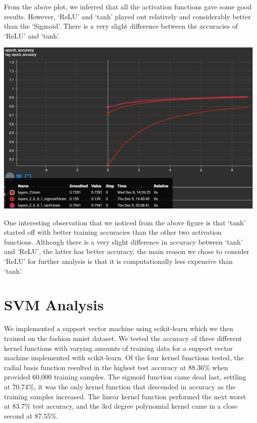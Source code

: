 \documentclass[12pt]{article}
\begin{document}
From the above plot, we inferred that all the activation functions gave some good results. However, ‘ReLU’ and ‘tanh’ played out relatively and considerably better than the ‘Sigmoid’. There is a very slight difference between the accuracies of ‘ReLU’ and ‘tanh’. 

\bigskip

\includegraphics[scale=.77]{cnngraph4.PNG}

\newpage

One interesting observation that we noticed from the above figure is that ‘tanh’ started off with better training accuracies than the other two activation functions. Although there is a very slight difference in accuracy between ‘tanh’ and ‘ReLU', the latter has better accuracy, the main reason we chose to consider ‘ReLU’ for further analysis is that it is computationally less expensive than ‘tanh’.

\section{SVM Analysis}

We implemented a support vector machine using scikit-learn which we then trained on the fashion mnist dataset. We tested the accuracy of three different kernel functions with varying amounts of training data for a support vector machine implemented with scikit-learn. Of the four kernel functions tested, the radial basis function resulted in the highest test accuracy at 88.36\% when provided 60,000 training samples. The sigmoid function came dead last, settling at 70.74\%, it was the only kernel function that descended in accuracy as the training samples increased. The linear kernel function performed the next worst at 83.7\% test accuracy, and the 3rd degree polynomial kernel came in a close second at 87.55\%.
\end{document}
